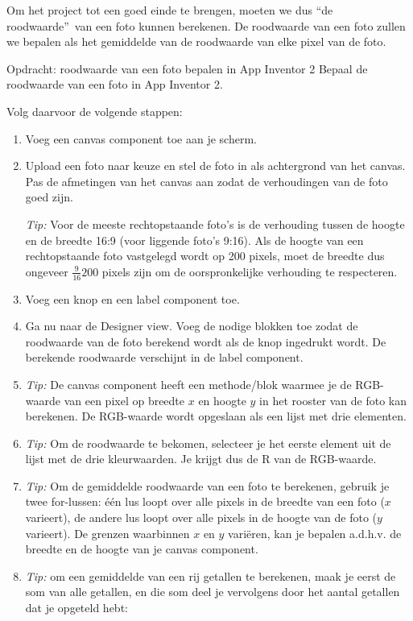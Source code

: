Om het project tot een goed einde te brengen, moeten we dus \textquotedblleft de roodwaarde\textquotedblright\  van een foto kunnen berekenen. 
De roodwaarde van een foto zullen we bepalen als het gemiddelde van de roodwaarde van elke pixel van de foto.


\begin{opdracht}{Opdracht: roodwaarde van een foto bepalen in App Inventor 2}
Bepaal de roodwaarde van een foto in App Inventor 2.

Volg daarvoor de volgende stappen:
\begin{enumerate}
	\item Voeg een canvas component toe aan je scherm. 
	\item Upload een foto naar keuze en stel de foto in als achtergrond van het canvas.
	Pas de afmetingen van het canvas aan zodat de verhoudingen van de foto goed zijn. 
	
	\emph{Tip:} Voor de meeste rechtopstaande foto's is de verhouding tussen de hoogte en de breedte 16:9 (voor liggende foto's 9:16). Als de hoogte van een rechtopstaande foto vastgelegd wordt op 200 pixels, moet de breedte dus ongeveer $\frac{9}{16}200$ pixels zijn om de oorspronkelijke verhouding te respecteren.
	 
	\item Voeg een knop en een label component toe.
	
	\item Ga nu naar de Designer view. Voeg de nodige blokken toe zodat de roodwaarde van de foto berekend wordt als de knop ingedrukt wordt. De berekende roodwaarde verschijnt in de label component.
	
	\item \emph{Tip:} De canvas component heeft een methode/blok waarmee je de RGB-waarde van een pixel op breedte $x$ en hoogte $y$ in het rooster van de foto kan berekenen. De RGB-waarde wordt opgeslaan als een lijst met drie elementen.
	\item \emph{Tip:} Om de roodwaarde te bekomen, selecteer je het eerste element uit de lijst met de drie kleurwaarden. Je krijgt dus de R van de RGB-waarde.
	\item \emph{Tip:} Om de gemiddelde roodwaarde van een foto te berekenen, gebruik je twee for-lussen: \'e\'en lus loopt over alle pixels in de breedte van een foto ($x$ varieert), de andere lus loopt over alle pixels in de hoogte van de foto ($y$ varieert). De grenzen waarbinnen $x$ en $y$ vari\"eren, kan je bepalen a.d.h.v. de breedte en de hoogte van je canvas component.
	\item \emph{Tip:} om een gemiddelde van een rij getallen te berekenen, maak je eerst de som van alle getallen, en die som deel je vervolgens door het aantal getallen dat je opgeteld hebt:
	

\end{enumerate}
\end{opdracht}
